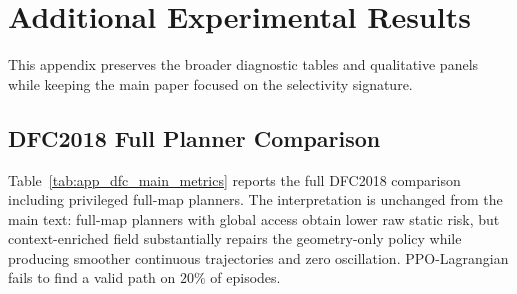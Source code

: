 \begin{table}[h]
\centering
\caption{\textbf{Empirical geometry-only deviation check for Theorem~\ref{thm:scaffold_preservation}.}
The theorem gives $\|P_\perp(q_t-q_t^{\rm geo})\|\le C_{\perp,N}\varepsilon_\perp$.
The experiments instantiate this as a thresholded rollout check: when the
projected context force is suppressed, lateral deviation from the geometry-only rollout
should stay below the measured reaction threshold $\delta$.}
\label{tab:app_scaffold_bound_check}
\small
\setlength{\tabcolsep}{4pt}
\renewcommand{\arraystretch}{1.08}
\end{table}

\section{Additional Experimental Results}
\label{app:additional_experiments}

This appendix preserves the broader diagnostic tables and qualitative
panels while keeping the main paper focused on the selectivity
signature.

\subsection{DFC2018 Full Planner Comparison}
\label{app:dfc_full}

Table~\ref{tab:app_dfc_main_metrics} reports the full DFC2018
comparison including privileged full-map planners.
The interpretation is unchanged from the main text: full-map planners
with global access obtain lower raw static risk, but context-enriched field
substantially repairs the geometry-only policy while producing smoother
continuous trajectories and zero oscillation.
PPO-Lagrangian fails to find a valid path on $20\%$ of episodes.

